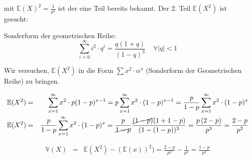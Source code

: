 \begin{uebsp}
\begin{Answer}
\begin{enumerate}[i)]
            mit $\mathbb{E}(X)^2=\frac{1}{p^2}$ ist der eine Teil bereits bekannt. Der 2. Teil $\mathbb{E}(X^2)$ ist gesucht:

            \begin{uebsp_theory}
                Sonderform der geometrischen Reihe:
                \[\sum_{i=0}^\infty i^2\cdot q^i=\frac{q(1+q)}{(1-q)^3}\;\;\;\;\forall |q|<1\]
            \end{uebsp_theory}

            Wir versuchen, $\mathbb{E}(X^2)$ in die Form $\sum x^2\cdot \alpha^x$ (Sonderform der Geometrischen Reihe) zu bringen.

            \begin{eqnarray*}
                \mathbb{E}(X^2) &=& \sum_{x=1}^{\infty}x^2\cdot p(1-p)^{x-1}=p\sum_{x=1}^{\infty}x^2\cdot (1-p)^{x-1}=\frac{p}{1-p}\sum_{x=1}^{\infty}x^2\cdot (1-p)^{x} \\
                \mathbb{E}(X^2) &=& \frac{p}{1-p}\sum_{x=1}^{\infty}x^2\cdot (1-p)^{x} = \frac{p}{\cancel{1-p}}\frac{\cancel{(1-p)}(1+1-p)}{(1-(1-p))^3}=\frac{p\,(2-p)}{p^3}=\frac{2-p}{p^2}
            \end{eqnarray*}

            \begin{eqnarray*}
                \mathbb V(X)&=&\mathbb E(X^2)-(\mathbb E(x))^2) = \frac{2-p}{p^2}-\frac{1}{p^2}=\frac{1-p}{p^2}
            \end{eqnarray*}
    \end{enumerate}
\end{Answer}
\end{uebsp}
